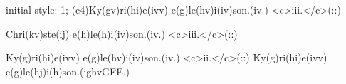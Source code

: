 initial-style: 1;
(c4)Ky(gv)ri(hi)e(ivv) e(g)le(hv)i(iv)son.(iv.) <c>iii.</c>(::)

Chri(kv)ste(ij) e(h)le(h)i(iv)son.(iv.) <c>iii.</c>(::)

Ky(g)ri(hi)e(ivv) e(g)le(hv)i(iv)son.(iv.) <c>ii.</c>(::) Ky(g)ri(hi)e(ivv) e(g)le(hj)i(h)son.(ighvGFE.)
